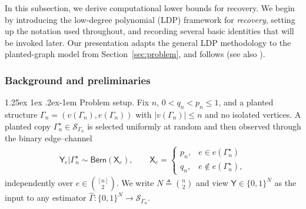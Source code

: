 \documentclass[12pt]{article}
\makeatletter
\newcommand{\s}[1]{\mathsf{#1}}
\renewcommand{\paragraph}{%
  \@startsection{paragraph}{4}%
  {\z@}{1.25ex \@plus 1ex \@minus .2ex}{-1em}%
  {\normalfont\normalsize\bfseries}%
}
\makeatother
\begin{document}
In this subsection, we derive computational lower bounds for recovery. We begin by introducing the low-degree polynomial (LDP) framework for \emph{recovery}, setting up the notation used throughout, and recording several basic identities that will be invoked later. Our presentation adapts the general LDP methodology to the planted-graph model from Section~\ref{sec:problem}, and follows \cite{SchrammWein2022} (see also \cite{BKYLowDegreeSurvey}).

\subsubsection{Background and preliminaries}

\paragraph{Problem setup.} Fix $n$, $0<q_n<p_n\leq 1$, and a planted structure $\Gamma_n=(v(\Gamma_n),e(\Gamma_n))$ with $|v(\Gamma_n)|\le n$ and no isolated vertices. A planted copy $\Gamma_n^\star\in\mathcal{S}_{\Gamma_n}$ is selected uniformly at random and then observed through the binary edge--channel
\begin{align}
\left.\s{Y}_e \right| \Gamma_n^\star \sim \s{Bern}(\s{X}_e), 
\qquad
\s{X}_e=\begin{cases}
p_n, & e\in e(\Gamma_n^\star)\\
q_n, & e\notin e(\Gamma_n^\star),
\end{cases}
\end{align}
independently over $e\in \binom{[n]}{2}$. We write $N\triangleq\binom{n}{2}$ and view $\s{Y}\in\{0,1\}^{N}$ as the input to any estimator $\hat{\Gamma}:\{0,1\}^{N}\to \mathcal{S}_{\Gamma_n}$.
\end{document}
